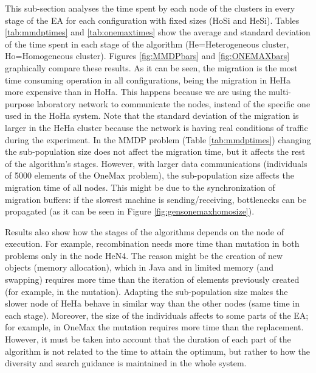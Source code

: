 \documentclass[final,1p,times]{elsarticle}
\begin{document}
This sub-section analyses the time spent by each node of the clusters in every stage of the EA for each configuration with fixed sizes (HoSi and HeSi). Tables \ref{tab:mmdptimes} and \ref{tab:onemaxtimes} show the average and standard deviation of the time spent in each stage of the algorithm (He=Heterogeneous cluster, Ho=Homogeneous cluster). Figures \ref{fig:MMDPbars} and \ref{fig:ONEMAXbars} graphically compare these results. As it can be seen, the migration is the most time consuming operation in all configurations, being the migration in HeHa more expensive than in HoHa. This happens because we are using the multi-purpose laboratory network to communicate the nodes, instead of the specific one used in the HoHa system. Note that the standard deviation of the migration is larger in the HeHa cluster because the network is having real conditions of traffic during the experiment. In the MMDP problem (Table \ref{tab:mmdptimes}) changing the sub-population size does not affect the migration time, but it affects the rest of the algorithm's stages. However, with larger data communications (individuals of 5000 elements of the OneMax problem), the sub-population size affects the migration time of all nodes. This might be due to the synchronization of migration buffers: if the slowest machine is sending/receiving, bottlenecks can be propagated (as it can be seen in Figure \ref{fig:gensonemaxhomosize}). 

Results also show how the stages of the algorithms depends on the node
of execution. For example, recombination needs more time than mutation
in both problems only in the node HeN4. The reason might be the
creation of new objects (memory allocation), which in Java and in
limited memory (and swapping) requires more time than the iteration of
elements previously created (for example, in the mutation). Adapting
the sub-population size makes the slower node of HeHa behave in similar
way than the other nodes (same time in each stage). Moreover, the size
of the individuals affects to some parts of the EA; for example, in 
OneMax the mutation requires more time than the replacement. However,
it must be taken into account that the duration of each part of the
algorithm is not related to the time to attain the optimum, but rather to
how the diversity and search guidance is maintained in the whole system.  
\end{document}
